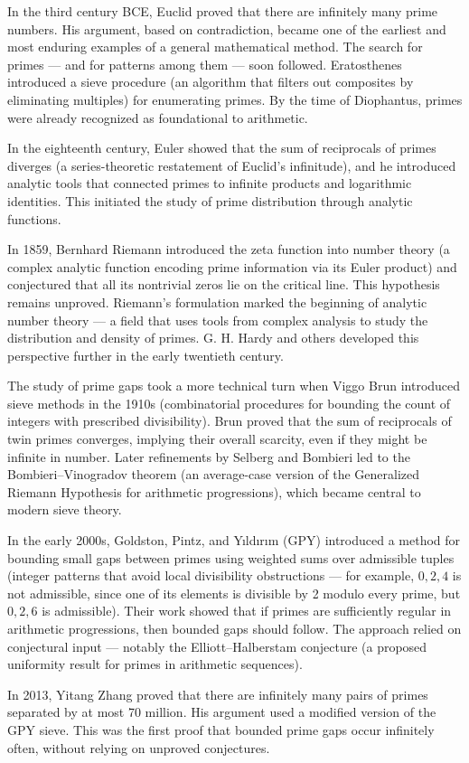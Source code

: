\begin{historical}
In the third century BCE, Euclid proved that there are infinitely many prime numbers. His argument, based on contradiction, became one of the earliest and most enduring examples of a general mathematical method. The search for primes — and for patterns among them — soon followed. Eratosthenes introduced a sieve procedure (an algorithm that filters out composites by eliminating multiples) for enumerating primes. By the time of Diophantus, primes were already recognized as foundational to arithmetic.

In the eighteenth century, Euler showed that the sum of reciprocals of primes diverges (a series-theoretic restatement of Euclid’s infinitude), and he introduced analytic tools that connected primes to infinite products and logarithmic identities. This initiated the study of prime distribution through analytic functions.

In 1859, Bernhard Riemann introduced the zeta function into number theory (a complex analytic function encoding prime information via its Euler product) and conjectured that all its nontrivial zeros lie on the critical line. This hypothesis remains unproved. Riemann’s formulation marked the beginning of analytic number theory — a field that uses tools from complex analysis to study the distribution and density of primes. G. H. Hardy and others developed this perspective further in the early twentieth century.

The study of prime gaps took a more technical turn when Viggo Brun introduced sieve methods in the 1910s (combinatorial procedures for bounding the count of integers with prescribed divisibility). Brun proved that the sum of reciprocals of twin primes converges, implying their overall scarcity, even if they might be infinite in number. Later refinements by Selberg and Bombieri led to the Bombieri–Vinogradov theorem (an average-case version of the Generalized Riemann Hypothesis for arithmetic progressions), which became central to modern sieve theory.

In the early 2000s, Goldston, Pintz, and Yıldırım (GPY) introduced a method for bounding small gaps between primes using weighted sums over admissible tuples (integer patterns that avoid local divisibility obstructions — for example, ${0, 2, 4}$ is not admissible, since one of its elements is divisible by 2 modulo every prime, but ${0, 2, 6}$ is admissible). Their work showed that if primes are sufficiently regular in arithmetic progressions, then bounded gaps should follow. The approach relied on conjectural input — notably the Elliott–Halberstam conjecture (a proposed uniformity result for primes in arithmetic sequences).

In 2013, Yitang Zhang proved that there are infinitely many pairs of primes separated by at most 70 million. His argument used a modified version of the GPY sieve. This was the first proof that bounded prime gaps occur infinitely often, without relying on unproved conjectures.
\end{historical}
